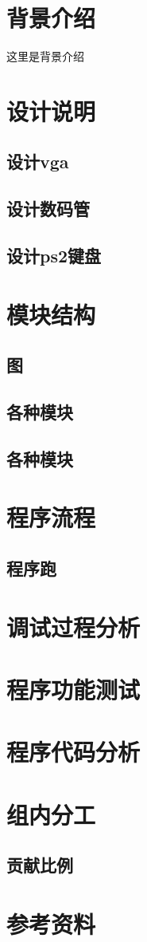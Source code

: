 \documentclass{ctexart}
\begin{document}
\newpage
\tableofcontents
\newpage
    \section{背景介绍}
    这里是背景介绍
    \section{设计说明}
        \subsection{设计vga}
        \subsection{设计数码管}
        \subsection{设计ps2键盘}
    \section{模块结构}
        \subsection{图}
        \subsection{各种模块}
        \subsection{各种模块}
    \section{程序流程} 
        \subsection{程序跑}
    \section{调试过程分析}
    \section{程序功能测试}
    \section{程序代码分析}
    \section{组内分工}
        \subsection{贡献比例}
    \section{参考资料}
    
\end{document}
